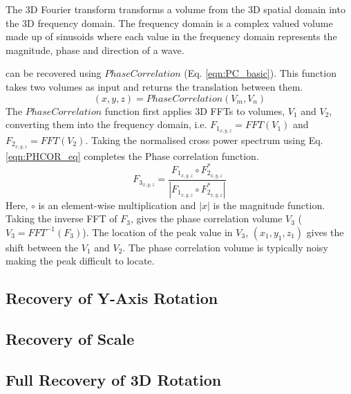The 3D Fourier transform transforms a volume from the 3D spatial domain into the 3D frequency domain. The frequency domain is a complex valued volume made up of sinusoids where each value in the frequency domain represents the magnitude, phase and direction of a wave. 


 can be recovered using $PhaseCorrelation$ (Eq. \ref{eqn:PC_basic}). This function takes two volumes as input and returns the translation between them.
\begin{equation} \label{eqn:PC_basic}
(x, y, z) = PhaseCorrelation(V_m, V_n)
\end{equation}
The $PhaseCorrelation$ function first applies 3D FFTs to volumes, $V_1$ and $V_2$, converting them into the frequency domain, i.e. $F_{1_{x,y,z}} = FFT(V_1)$ and $F_{2_{x,y,z}} = FFT(V_2)$. Taking the normalised cross power spectrum using Eq. \ref{eqn:PHCOR_eq} completes the Phase correlation function. 
\begin{equation} \label{eqn:PHCOR_eq}
F_{3_{x,y,z}} = \frac{F_{1_{x,y,z}} \circ F_{2_{x,y,z}}^*}{ | F_{1_{x,y,z}} \circ F_{2_{x,y,z}}^* | }
\end{equation}
Here, $\circ$ is an element-wise multiplication and $|x|$ is the magnitude function. Taking the inverse FFT of $F_3$, gives the phase correlation volume $V_3$ ($V_3 = FFT^{-1}(F_3)$). The location of the peak value in $V_3$, $(x_1, y_1, z_1)$ gives the shift between the $V_1$ and $V_2$. The phase correlation volume is typically noisy making the peak difficult to locate. 


\subsection{Recovery of Y-Axis Rotation}

\subsection{Recovery of Scale}

\subsection{Full Recovery of 3D Rotation}
